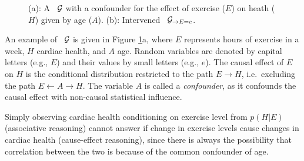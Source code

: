 \begin{figure}[t!]
\centering
{}
\hskip0.3cm
\caption{(a): A \CBN~${\cal G}$ with a confounder for the effect of exercise ($E$) on heath ($H$) given by age ($A$). 
(b): Intervened \CBN~${\cal G}_{\rightarrow E=e}$.}
\label{fig:CBN}
\vspace{-0.5cm}
\end{figure}
An example of \CBN~${\cal G}$ is given in Figure \ref{fig:CBN}a, where $E$ represents hours of exercise in a week, $H$ cardiac health, and $A$ age. 
Random variables are denoted by capital letters (e.g., $E$) and their values by small letters (e.g., $e$). The causal effect of $E$ on $H$ is the conditional distribution restricted to the path $E\rightarrow H$, i.e.~excluding the path $E\leftarrow A \rightarrow H$. The variable $A$ is called a \emph{confounder}, as it confounds the causal effect with non-causal statistical influence. 

Simply observing cardiac health conditioning on exercise level from $p(H|E)$ (associative reasoning) cannot answer if change in exercise levels cause changes in cardiac health (cause-effect reasoning), since there is always the possibility that correlation between the two is because of the common confounder of age. 

